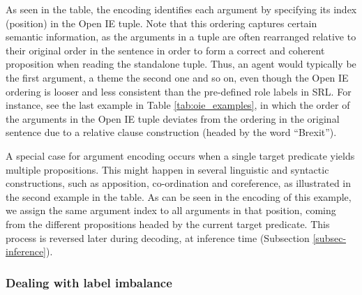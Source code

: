 As seen in the table, the encoding identifies each argument by specifying its index (position) in the Open IE tuple.
Note that this ordering captures certain semantic information, as the arguments in a tuple are often rearranged relative to their original order in the sentence in order to form
a correct and coherent proposition when reading the standalone tuple. Thus, an agent would typically be the first argument, a theme the second one and so on, even though the Open IE ordering is looser and less consistent than the pre-defined role labels in SRL.
For instance, see the last example in Table \ref{tab:oie_examples}, in which the order of the arguments
in the Open IE tuple deviates from the ordering in the original sentence due to
a relative clause construction (headed by the word ``Brexit'').

A special case for argument encoding occurs when a single target predicate yields multiple propositions.
This might happen in several linguistic and syntactic constructions, such as apposition, co-ordination and coreference, as illustrated in the second example in the table. As can be seen in the encoding of this example, we assign the same argument index to all arguments in that position, coming from the different propositions headed by the current target predicate. This process is reversed later during decoding, at inference time (Subsection \ref{subsec-inference}).

\subsubsection{Dealing with label imbalance}



